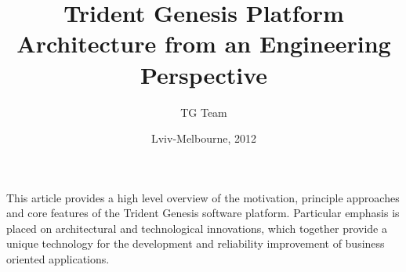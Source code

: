 \begin{titlepage}
\AddToShipoutPicture*{\BackgroundPic}
\title{Trident Genesis Platform Architecture from an Engineering Perspective}
\author{TG Team}
\date{Lviv-Melbourne, 2012}
\maketitle
\clearpage
\AddToShipoutPicture*{\BackgroundPic}
  This article provides a high level overview of the motivation, principle approaches and core features of the Trident Genesis software platform.
  Particular emphasis is placed on architectural and technological innovations, which together provide a unique technology for the development and reliability improvement of business oriented applications.

\clearpage
\AddToShipoutPicture*{\BackgroundPic}
\tableofcontents
\clearpage

\end{titlepage}